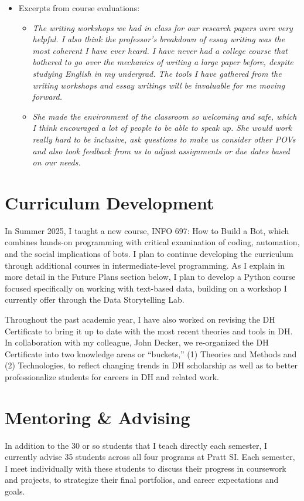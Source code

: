 \documentclass[12pt]{article}
\begin{document}
\begin{itemize}
\begin{itemize}
\item Excerpts from course evaluations:
\begin{itemize}
\item \emph{The writing workshops we had in class for our research papers
were very helpful. I also think the professor's breakdown of
essay writing was the most coherent I have ever heard. I have
never had a college course that bothered to go over the
mechanics of writing a large paper before, despite studying
English in my undergrad. The tools I have gathered from the
writing workshops and essay writings will be invaluable for me
moving forward.}
\item \emph{She made the environment of the classroom so welcoming and
safe, which I think encouraged a lot of people to be able to
speak up. She would work really hard to be inclusive, ask
questions to make us consider other POVs and also took feedback
from us to adjust assignments or due dates based on our needs.}
\end{itemize}
\end{itemize}
\end{itemize}

\section*{Curriculum Development}
\label{sec:orgb2c9f7f}
In Summer 2025, I taught a new course, INFO 697: How to Build a Bot,
which combines hands-on programming with critical examination of
coding, automation, and the social implications of bots. I plan to
continue developing the curriculum through additional courses in
intermediate-level programming. As I explain in more detail in the
Future Plans section below, I plan to develop a Python course focused
specifically on working with text-based data, building on a workshop I
currently offer through the Data Storytelling Lab.

Throughout the past academic year, I have also worked on revising the
DH Certificate to bring it up to date with the most recent theories
and tools in DH. In collaboration with my colleague, John Decker, we
re-organized the DH Certificate into two knowledge areas or
``buckets,'' (1) Theories and Methods and (2) Technologies, to reflect
changing trends in DH scholarship as well as to better professionalize
students for careers in DH and related work.

\section*{Mentoring \& Advising}
\label{sec:org36d1537}
In addition to the 30 or so students that I teach directly each
semester, I currently advise 35 students across all four programs at
Pratt SI. Each semester, I meet individually with these students to
discuss their progress in coursework and projects, to strategize their
final portfolios, and career expectations and goals.
\end{document}

